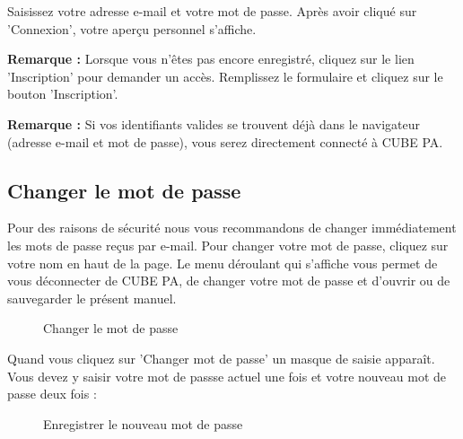 Saisissez votre adresse e-mail et votre mot de passe. Après avoir cliqué sur 'Connexion', votre aperçu personnel s'affiche.

\vspace{\baselineskip}

\textbf{Remarque :} Lorsque vous n'êtes pas encore enregistré, cliquez sur le lien 'Inscription' pour demander un accès. Remplissez le formulaire et cliquez sur le bouton 'Inscription'.

\vspace{\baselineskip}

\textbf{Remarque :} Si vos identifiants valides se trouvent déjà dans le navigateur (adresse e-mail et mot de passe), vous serez directement connecté à CUBE PA.

\subsection{Changer le mot de passe}
\label{bkm:Ref434828103}

Pour des raisons de sécurité nous vous recommandons de changer immédiatement les mots de passe reçus par e-mail. Pour changer votre mot de passe, cliquez sur votre nom en haut de la page. Le menu déroulant qui s'affiche vous permet de vous déconnecter de CUBE PA, de changer votre mot de passe et d'ouvrir ou de sauvegarder le présent manuel.

\begin{figure}[H]
\caption{Changer le mot de passe}
\end{figure}

Quand vous cliquez sur 'Changer mot de passe' un masque de saisie apparaît. Vous devez y saisir votre mot de passse actuel une fois et votre nouveau mot de passe deux fois :

\begin{figure}[H]
\caption{Enregistrer le nouveau mot de passe}
\end{figure}

